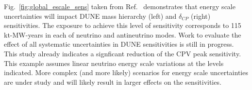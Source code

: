  Fig.~\ref{fig:global_escale_sens} taken from Ref.~\cite{dunecdr} demonstrates that
energy scale uncertainties will impact DUNE 
mass hierarchy (left) and $\delta_{CP}$ (right) sensitivities.
The exposure to achieve this level of sensitivity corresponds to 
115 kt-MW-years in each of neutrino and antineutrino modes.
Work to evaluate the effect of all systematic uncertainties in DUNE sensitivities is still in progress.
This study already indicates a signficant reduction of the CPV peak sensitivity. 
This example assumes linear neutrino energy scale variations at the levels indicated.
More complex (and more likely) scenarios for energy scale uncertainties are under study and
will likely result in larger effects on the sensitivities.
